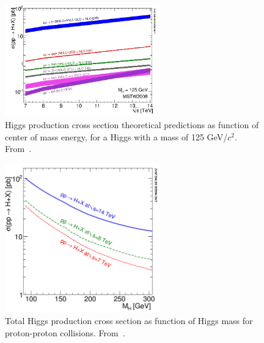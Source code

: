 \begin{figure}[!Hhtbp]
  \begin{center}
    \includegraphics[width=0.6\textwidth]{figs/7-14_Higgs_xsec.jpg}
    \caption{Higgs production cross section theoretical predictions as function of center of mass energy, for a Higgs with a mass of 125 GeV/$c^{2}$.  From~\cite{Dittmaier:2011ti, Dittmaier:2012vm, Heinemeyer:2013tqa, HIGGSXSWG}.}
    \label{fig:HiggsProdXS}
  \end{center}
\end{figure}

\begin{figure}[!Hhtbp]
  \begin{center}
    \includegraphics[width=0.6\textwidth]{figs/totalXS_LM.png}
    \caption{Total Higgs production cross section as function of Higgs mass for proton-proton collisions. From~\cite{Dittmaier:2011ti, Dittmaier:2012vm, Heinemeyer:2013tqa, HIGGSXSWG}.}
    \label{fig:TotalHiggsXS}
  \end{center}
\end{figure}


